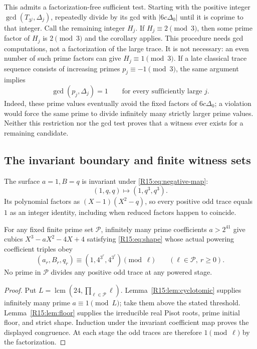 \documentclass[11pt,a4paper]{article}
\theoremstyle{definition}\newtheorem{definition}[theorem]{Definition}
\theoremstyle{remark}\newtheorem{remark}[theorem]{Remark}
\DeclareMathOperator{\lcm}{lcm}\DeclareMathOperator{\disc}{disc}\DeclareMathOperator{\Res}{Res}
\begin{document}
This admits a factorization-free sufficient test. Starting with the
positive integer $\gcd(T_{3^j},\Delta_j)$, repeatedly divide by
its gcd with $|6c\Delta_0|$ until it is coprime to that integer.
Call the remaining integer $H_j$. If $H_j\equiv2\pmod3$,
then some prime factor of $H_j$ is $2\pmod3$ and the corollary
applies. This procedure needs gcd computations, not a factorization
of the large trace. It is not necessary: an even number of such
prime factors can give $H_j\equiv1\pmod3$.
If a late classical trace sequence consists of increasing primes
$p_j\equiv-1\pmod3$, the same argument implies
\[
 \gcd(p_j,\Delta_j)=1\qquad\text{for every sufficiently large }j.
\]
Indeed, these prime values eventually avoid the fixed factors of
$6c\Delta_0$; a violation would force the same prime to divide
infinitely many strictly larger prime values. Neither this
restriction nor the gcd test proves that a witness ever exists for
a remaining candidate.

\subsection{The invariant boundary and finite witness sets}

The surface $a=1,B=q$ is invariant under \eqref{R15:eq:negative-map}:
\[
 (1,q,q)\longmapsto(1,q^3,q^3).
\]
Its polynomial factors as $(X-1)(X^2-q)$, so every positive odd
trace equals $1$ as an integer identity, including when reduced
factors happen to coincide.

\begin{proposition}\label{R15:prop:boundary}
For any fixed finite prime set $\mathcal P$, infinitely many prime
coefficients $a>2^{41}$ give cubics $X^3-aX^2-4X+4$ satisfying
\eqref{R15:eq:shape} whose actual powering coefficient triples obey
\[
 (a_r,B_r,q_r)\equiv(1,4^{3^r},4^{3^r})\pmod\ell
 \qquad(\ell\in\mathcal P,\ r\ge0).
\]
No prime in $\mathcal P$ divides any positive odd trace at any
powered stage.
\end{proposition}
\begin{proof}
Put $L=\lcm(24,\prod_{\ell\in\mathcal P}\ell)$.
Lemma~\ref{R15:lem:cyclotomic} supplies infinitely many prime
$a\equiv1\pmod L$; take them above the stated threshold.
Lemma~\ref{R15:lem:floor} supplies the irreducible real Pisot roots,
prime initial floor, and strict shape. Induction under the invariant
coefficient map proves the displayed congruence. At each stage the
odd traces are therefore $1\pmod\ell$ by the factorization.
\end{proof}
\end{document}
